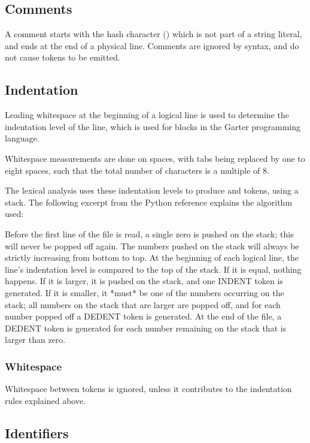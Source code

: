 \subsection{Comments}

A comment starts with the hash character (\code{\#}) which is not part of a
string literal, and ends at the end of a physical line. Comments are ignored by
syntax, and do not cause tokens to be emitted.

\subsection{Indentation}

Leading whitespace at the beginning of a logical line is used to determine the
indentation level of the line, which is used for blocks in the Garter
programming language.

Whitespace measurements are done on spaces, with tabs being replaced by one to
eight spaces, such that the total number of characters is a multiple of 8.

The lexical analysis uses these indentation levels to produce  and
 tokens, using a stack. The following excerpt from the Python
reference explains the algorithm used:

Before the first line of the file is read, a single zero is pushed on the stack;
this will never be popped off again.  The numbers pushed on the stack will
always be strictly increasing from bottom to top.  At the beginning of each
logical line, the line's indentation level is compared to the top of the stack.
If it is equal, nothing happens. If it is larger, it is pushed on the stack, and
one INDENT token is generated.  If it is smaller, it *must* be one of the
numbers occurring on the stack; all numbers on the stack that are larger are
popped off, and for each number popped off a DEDENT token is generated.  At the
end of the file, a DEDENT token is generated for each number remaining on the
stack that is larger than zero.

\subsubsection{Whitespace}

Whitespace between tokens is ignored, unless it contributes to the indentation
rules explained above.

\subsection{Identifiers}
\label{sec:lex_identifiers}


